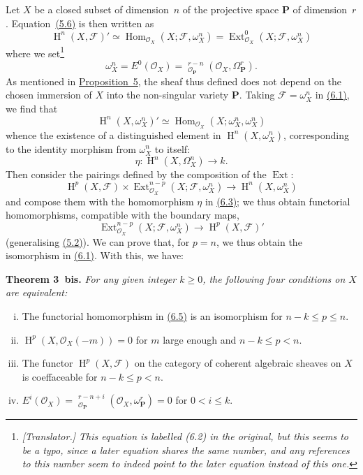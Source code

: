 \documentclass{article}
\newenvironment{itenv}[1]
  {\phantomsection\par\medskip\noindent\textbf{#1.}\itshape}
  {\par\medskip}
\newcommand{\scr}[1]{{\mathscr{#1}}}
\newcommand{\bb}{\mathbf}
\renewcommand{\geq}{\geqslant}
\renewcommand{\leq}{\leqslant}
\DeclareMathOperator{\Ext}{Ext}
\DeclareMathOperator{\Hom}{Hom}
\DeclareMathOperator{\shExt}{\underline{Ext}}
\DeclareMathOperator{\HH}{H}
\newcommand{\oldpage}[1]{\marginpar{\footnotesize$\Big\vert$ \textit{p.~#1}}}
\begin{document}
Let $X$ be a closed subset of dimension~$n$ of the projective space $\bb{P}$ of dimension~$r$.
Equation~\hyperref[5.6]{(5.6)} is then written as
\[
\label{6.1}
  \HH^n(X,\scr{F})'
  \simeq \Hom_{\scr{O}_X}(X;\scr{F},\omega_X^n)
  = \Ext_{\scr{O}_X}^0(X;\scr{F},\omega_X^n)
\tag{6.1}
\]
where we set\footnote{\emph{[Translator.] This equation is labelled (6.2) in the original, but this seems to be a typo, since a later equation shares the same number, and any references to this number seem to indeed point to the later equation instead of this one.}}
\[
  \omega_X^n = E^0(\scr{O}_X) = \shExt_{\scr{O}_\bb{P}}^{r-n}(\scr{O}_X,\Omega_\bb{P}^r).
\]
As mentioned in \hyperref[proposition5]{Proposition~5}, the sheaf thus defined does not depend on the chosen immersion of $X$ into the non-singular variety $\bb{P}$.
Taking $\scr{F}=\omega_X^n$ in \hyperref[6.1]{(6.1)}, we find that
\[
\label{6.2}
  \HH^n(X,\omega_X^n)' \simeq \Hom_{\scr{O}_X}(X;\omega_X^n,\omega_X^n)
\tag{6.2}
\]
whence the existence of a distinguished element in $\HH^n(X,\omega_X^n)$, corresponding to the identity morphism from $\omega_X^n$ to itself:
\[
\label{6.3}
  \eta\colon \HH^n(X,\Omega_X^n) \to k.
\tag{6.3}
\]
\oldpage{149-18}
Then consider the pairings defined by the composition of the $\Ext$:
\[
\label{6.4}
  \HH^p(X,\scr{F}) \times \Ext_{\scr{O}_X}^{n-p}(X;\scr{F},\omega_X^n)
  \to \HH^n(X,\omega_X^n)
\tag{6.4}
\]
and compose them with the homomorphism $\eta$ in \hyperref[6.3]{(6.3)}; we thus obtain functorial homomorphisms, compatible with the boundary maps,
\[
\label{6.5}
  \Ext_{\scr{O}_X}^{n-p}(X;\scr{F},\omega_X^n) \to \HH^p(X,\scr{F})'
\tag{6.5}
\]
(generalising \hyperref[5.2]{(5.2)}).
We can prove that, for $p=n$, we thus obtain the isomorphism in \hyperref[6.1]{(6.1)}.
With this, we have:

\begin{itenv}{Theorem 3~bis}
\label{theorem3bis}
  For any given integer $k\geq0$, the following four conditions on $X$ are equivalent:
  \begin{enumerate}[i.]
    \item The functorial homomorphism in \hyperref[6.5]{(6.5)} is an isomorphism for $n-k\leq p\leq n$.
    \item $\HH^p(X,\scr{O}_X(-m)) = 0$ for $m$ large enough and $n-k\leq p<n$.
    \item The functor $\HH^p(X,\scr{F})$ on the category of coherent algebraic sheaves on $X$ is coeffaceable for $n-k\leq p<n$.
    \item $E^i(\scr{O}_X) = \shExt_{\scr{O}_\bb{P}}^{r-n+i}(\scr{O}_X,\omega_\bb{P}^r) = 0$ for $0<i\leq k$.
  \end{enumerate}
\end{itenv}
\end{document}
